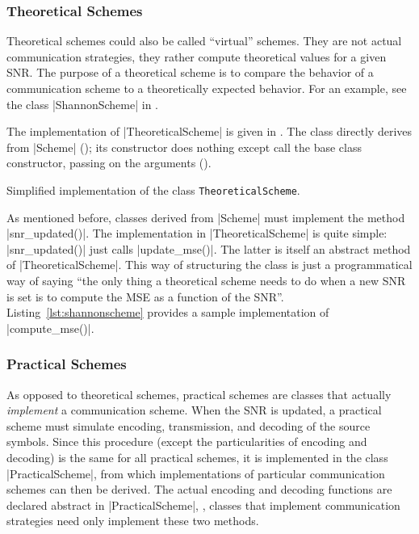\subsubsection{Theoretical Schemes}

Theoretical schemes could also be called ``virtual'' schemes. They are not
actual communication strategies, they rather compute theoretical values for a
given SNR. The purpose of a theoretical scheme is to compare the behavior of a
communication scheme to a theoretically expected behavior. For an example, see
the class |ShannonScheme| in .

The implementation of |TheoreticalScheme| is given in
. The class directly derives from |Scheme|
(); its constructor does nothing except call the base class
constructor, passing on the arguments (). 

\begin{listing}
  \caption{Simplified implementation of the class \texttt{TheoreticalScheme}.}
  \label{lst:theoreticalscheme}
\end{listing}

As mentioned before, classes derived from |Scheme| must implement the method
|snr_updated()|. The implementation in |TheoreticalScheme| is quite simple:
|snr_updated()| just calls |update_mse()|. The latter is itself an abstract
method of |TheoreticalScheme|. This way of structuring the class is just a
programmatical way of saying ``the only thing a theoretical scheme needs to do
when a new SNR is set is to compute the MSE as a function of the SNR''.
Listing~\ref{lst:shannonscheme} provides a sample implementation of
|compute_mse()|. 


\subsubsection{Practical Schemes}

As opposed to theoretical schemes, practical schemes are classes that actually
\emph{implement} a communication scheme. When the SNR is updated, a practical
scheme must simulate encoding, transmission, and decoding of the source symbols.
Since this procedure (except the particularities of encoding and decoding) is
the same for all practical schemes, it is implemented in the class
|PracticalScheme|, from which implementations of particular communication
schemes can then be derived. The actual encoding and decoding functions are
declared abstract in |PracticalScheme|, \ie, classes that implement
communication strategies need only implement these two methods. 

